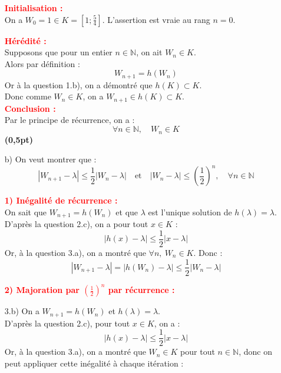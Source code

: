 \documentclass[12pt,a4paper]{article}
\begin{document}
\begin{enumerate}
        \textcolor{red}{\textbf{Initialisation :}}\\
        On a \( W_0 = 1 \in K = \left[1 ; \frac{5}{4} \right] \). L’assertion est vraie au rang \( n = 0 \).

        \textcolor{red}{\textbf{Hérédité :}}\\
        Supposons que pour un entier \( n \in \mathbb{N} \), on ait \( W_n \in K \).\\
        Alors par définition :
        \[
            W_{n+1} = h(W_n)
        \]
        Or à la question 1.b), on a démontré que \( h(K) \subset K \).\\
        Donc comme \( W_n \in K \), on a \( W_{n+1} \in h(K) \subset K \).\\

        \textcolor{red}{\textbf{Conclusion :}}\\
        Par le principe de récurrence, on a :
        \[
            \forall n \in \mathbb{N},\quad W_n \in K
        \]
        \hfill \textbf{(0,5pt)}

    \item[b)] On veut montrer que :
        \[
            |W_{n+1} - \lambda| \leq \frac{1}{2}|W_n - \lambda| \quad \text{et} \quad |W_n - \lambda| \leq \left( \frac{1}{2} \right)^n, \quad \forall n \in \mathbb{N}
        \]

        \textcolor{red}{\textbf{1) Inégalité de récurrence :}}\\
        On sait que \( W_{n+1} = h(W_n) \) et que \( \lambda \) est l’unique solution de \( h(\lambda) = \lambda \).\\
        D’après la question 2.c), on a pour tout \( x \in K \) :
        \[
            |h(x) - \lambda| \leq \frac{1}{2} |x - \lambda|
        \]
        Or, à la question 3.a), on a montré que \( \forall n, \ W_n \in K \). Donc :
        \[
            |W_{n+1} - \lambda| = |h(W_n) - \lambda| \leq \frac{1}{2} |W_n - \lambda|
        \]

        \textcolor{red}{\textbf{2) Majoration par \( \left( \frac{1}{2} \right)^n \) par récurrence :}}\\

    \item[3.b)] On a \( W_{n+1} = h(W_n) \) et \( h(\lambda) = \lambda \).\\
        D’après la question 2.c), pour tout \( x \in K \), on a :
        \[
            |h(x) - \lambda| \leq \frac{1}{2} |x - \lambda|
        \]
        Or, à la question 3.a), on a montré que \( W_n \in K \) pour tout \( n \in \mathbb{N} \), donc on peut appliquer cette inégalité à chaque itération :


\end{enumerate}
\end{document}
